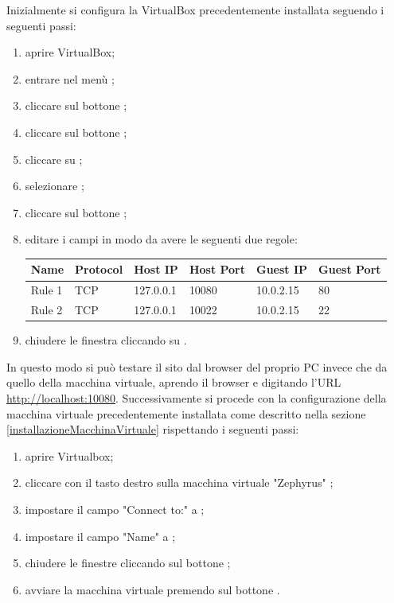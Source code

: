 	Inizialmente si configura la VirtualBox precedentemente installata seguendo i seguenti passi:
	\begin{enumerate}
		\item aprire VirtualBox;
		\item entrare nel menù ;
		\item cliccare sul bottone ;
		\item cliccare sul bottone ;
		\item cliccare su ;
		\item selezionare ;
		\item cliccare sul bottone ;
		\item editare i campi in modo da avere le seguenti due regole:  \\
		\begin{table}[H]
			\centering
			\begin{tabular}{|llllll|}
				\hline
				Name & Protocol & Host IP & Host Port & Guest IP & Guest Port \\ \hline
				Rule 1 & TCP & 127.0.0.1 & 10080 & 10.0.2.15 & 80 \\ \hline
				Rule 2 & TCP & 127.0.0.1 & 10022 & 10.0.2.15 & 22 \\ \hline
			\end{tabular}
		\end{table}
		\item chiudere le finestra cliccando su .
	\end{enumerate}
	In questo modo si può testare il sito dal browser del proprio PC invece che da quello della macchina virtuale, aprendo il browser e digitando l'URL \url{http://localhost:10080}.
	Successivamente si procede con la configurazione della macchina virtuale precedentemente installata come descritto nella sezione \ref{installazioneMacchinaVirtuale} rispettando i seguenti passi:
	\begin{enumerate}
		\item aprire Virtualbox;
		\item cliccare con il tasto destro sulla macchina virtuale "Zephyrus" ;
		\item impostare il campo "Connect to:" a ;
		\item impostare il campo "Name" a ;
		\item chiudere le finestre cliccando sul bottone ;
		\item avviare la macchina virtuale premendo sul bottone .
	\end{enumerate}
